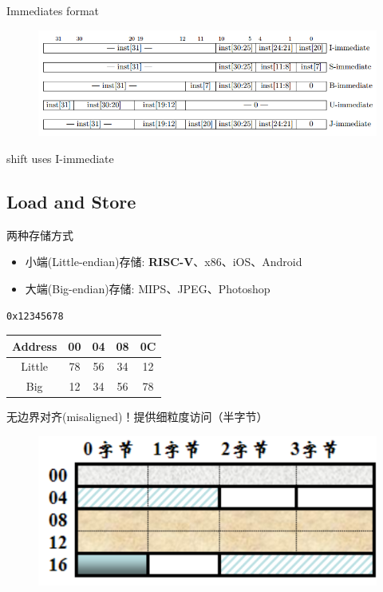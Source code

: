 \documentclass[UTF8]{ctexbeamer}
\begin{document}
\begin{frame}[fragile]{Immediates format}
\begin{figure}
\centering
\includegraphics[width=\linewidth]{fig/Lecture2/imm.PNG}
\end{figure}
shift uses I-immediate
\end{frame}

\subsection{Load and Store}
\begin{frame}
\subsectionpage
\end{frame}

\begin{frame}[fragile]{两种存储方式}
\begin{itemize}
	\item 小端(Little-endian)存储: \textbf{RISC-V}、x86、iOS、Android
	\item 大端(Big-endian)存储: MIPS、JPEG、Photoshop
\end{itemize}
\begin{center}
\verb'0x12345678'\qquad
\begin{tabular}{ccccc}
Address & 00 & 04 & 08 & 0C\\\hline
Little & 78 & 56 & 34 & 12\\\hline
Big & 12 & 34 & 56 & 78\\\hline
\end{tabular}
\end{center}
无边界对齐(misaligned)！提供细粒度访问（半字节）
\begin{figure}
\centering
\includegraphics[width=0.4\linewidth]{fig/Lecture2/aligned.PNG}
\end{figure}
\end{frame}
\end{document}
